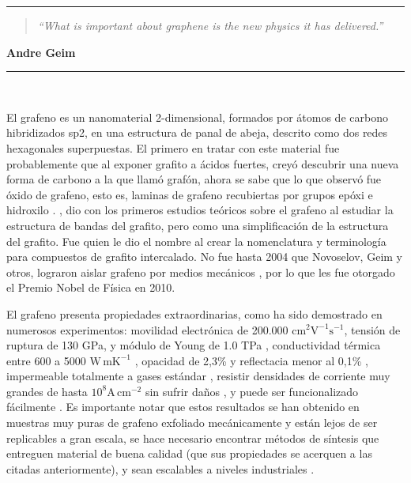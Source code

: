 \noindent
\rule{\linewidth}{1 pt}
\begin{flushright}
	\begin{quotation}
		\small{
			\textit{``What is important about graphene is the new physics it has delivered.''}}
	\end{quotation}
	\bf{Andre Geim}
\end{flushright}
\noindent
\rule{\linewidth}{1 pt}\\
\vfill

El grafeno es un nanomaterial 2-dimensional, formados por átomos de carbono  hibridizados sp2, en una estructura de panal de abeja, descrito como dos redes hexagonales superpuestas. El primero en tratar con este material fue probablemente \citet{Brodie1859} que al exponer grafito a ácidos fuertes, creyó descubrir una nueva forma de carbono a la que llamó grafón, ahora se sabe que lo que observó fue óxido de grafeno, esto es, laminas de grafeno recubiertas por grupos epóxi e hidroxilo \citep{Geim2012}. \citet{Wallace1947}, dio con los primeros estudios teóricos sobre el grafeno al estudiar la estructura de bandas del grafito, pero como una simplificación de la estructura del grafito. Fue \citet{Boehm1986} quien le dio el nombre al crear la nomenclatura y terminología para compuestos de grafito intercalado. No fue hasta 2004 que Novoselov, Geim y otros, lograron aislar grafeno por medios mecánicos \citep{Novoselov2004}, por lo que les fue otorgado el Premio Nobel de Física en 2010.

El grafeno presenta propiedades extraordinarias, como ha sido demostrado en numerosos experimentos: movilidad electrónica de 200.000 $\mathrm{cm^2 V^{-1} s^{-1} }$\citep{Bolotin2008}, tensión de ruptura de 130 GPa, y módulo de Young de 1.0 TPa \citep{Lee2008}, conductividad térmica entre 600 a 5000 $\mathrm{W\, mK^{-1}}$ \citep{Balandin2011}, opacidad de 2,3\% y reflectacia menor al 0,1\% \citep{Nair2008}, impermeable totalmente a gases estándar \citep{Bunch2007}, resistir densidades de corriente muy grandes de hasta $\mathrm{10^8 A\, cm^{-2}}$ sin sufrir daños  \citep{Moser2007}, y puede ser funcionalizado fácilmente \citep{Loh2010}. Es importante notar que estos resultados se han obtenido en muestras muy puras de grafeno exfoliado mecánicamente \citep{Novoselov2004} y están lejos de ser replicables a gran escala, se hace necesario encontrar métodos de síntesis que entreguen material de buena calidad (que sus propiedades se acerquen a las citadas anteriormente), y sean escalables a niveles industriales \citep{Novoselov2012}.

